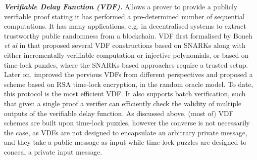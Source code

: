 \noindent\textbf{\textit{Verifiable Delay Function (VDF).}} Allows a prover to provide a publicly verifiable proof stating  it has performed  a pre-determined number of sequential computations. It has many applications, e.g. in decentralised systems to extract  trustworthy public randomness from a blockchain. VDF first formalised by Boneh \textit{et al} in \cite{BonehBBF18} that proposed several VDF constructions based on SNARKs along with either  incrementally verifiable computation or injective polynomials, or based on time-lock puzzles, where  the SNARKs based approaches require a trusted setup.  Later on,  \cite{Wesolowski19} improved the pervious VDFs  from different perspectives and proposed a scheme  based on RSA time-lock encryption, in the random oracle model. To date, this protocol is the most efficient VDF.  It also supports batch verification, such that given a single proof a verifier can efficiently check the validity of multiple outputs of the verifiable delay function. As discussed above, (most of) VDF schemes are built  upon time-lock puzzles, however the converse is not necessarily the case, as VDFs are not designed to encapsulate an  arbitrary private message, and they take a public message as input while time-lock puzzles are designed to conceal a private input message. 














